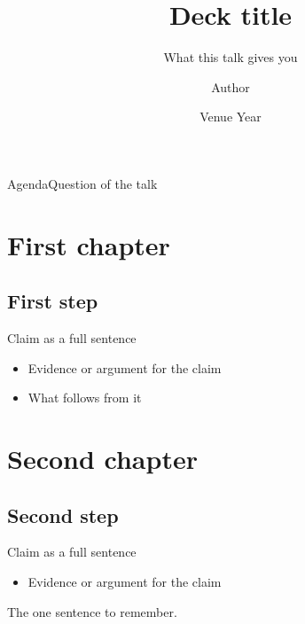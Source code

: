 \documentclass[aspectratio=169,11pt]{beamer}
\title{Deck title}
\subtitle{What this talk gives you}
\author{Author}
\institute{Team or institution}%
\date{Venue \textperiodcentered{} Year}
\begin{document}
\begin{frame}[plain]
  \titlepage
\end{frame}

\begin{frame}{Agenda}{Question of the talk}
  \tableofcontents
\end{frame}

\section{First chapter}
\subsection{First step}

\begin{frame}{Claim as a full sentence}
  \begin{itemize}
    \item Evidence or argument for the claim
    \item What follows from it
  \end{itemize}
\end{frame}

\section{Second chapter}
\subsection{Second step}

\begin{frame}{Claim as a full sentence}
  \begin{itemize}
    \item Evidence or argument for the claim
  \end{itemize}
\end{frame}

\begin{frame}[plain,c]
  \centering\Large The one sentence to remember.
\end{frame}
\end{document}
